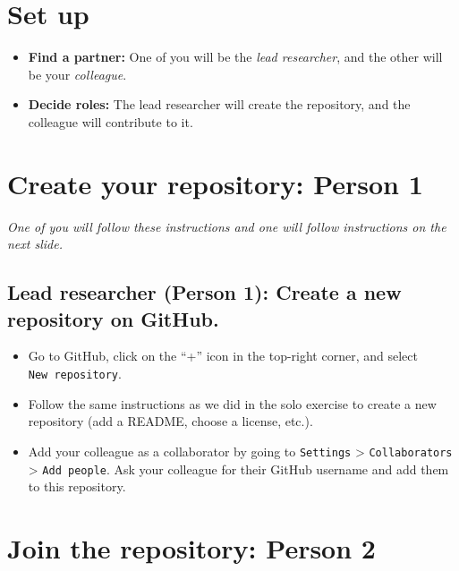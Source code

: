 \documentclass[
]{book}
\providecommand{\tightlist}{%
  \setlength{\itemsep}{0pt}\setlength{\parskip}{0pt}}
\begin{document}
\hypertarget{set-up}{%
\section{Set up}\label{set-up}}

\begin{itemize}
\tightlist
\item
  \textbf{Find a partner:} One of you will be the \emph{lead researcher}, and the other will be your \emph{colleague}.
\item
  \textbf{Decide roles:} The lead researcher will create the repository, and the colleague will contribute to it.
\end{itemize}

\hypertarget{create-your-repository-person-1}{%
\section{Create your repository: Person 1}\label{create-your-repository-person-1}}

\emph{One of you will follow these instructions and one will follow instructions on the next slide.}

\hypertarget{lead-researcher-person-1-create-a-new-repository-on-github.}{%
\subsection{\texorpdfstring{\textbf{Lead researcher (Person 1):} Create a new repository on GitHub.}{Lead researcher (Person 1): Create a new repository on GitHub.}}\label{lead-researcher-person-1-create-a-new-repository-on-github.}}

\begin{itemize}
\tightlist
\item
  Go to GitHub, click on the ``+'' icon in the top-right corner, and select \texttt{New\ repository}.
\item
  Follow the same instructions as we did in the solo exercise to create a new repository (add a README, choose a license, etc.).
\item
  Add your colleague as a collaborator by going to \texttt{Settings} \textgreater{} \texttt{Collaborators} \textgreater{} \texttt{Add\ people}. Ask your colleague for their GitHub username and add them to this repository.
\end{itemize}

\hypertarget{join-the-repository-person-2}{%
\section{Join the repository: Person 2}\label{join-the-repository-person-2}}
\end{document}
